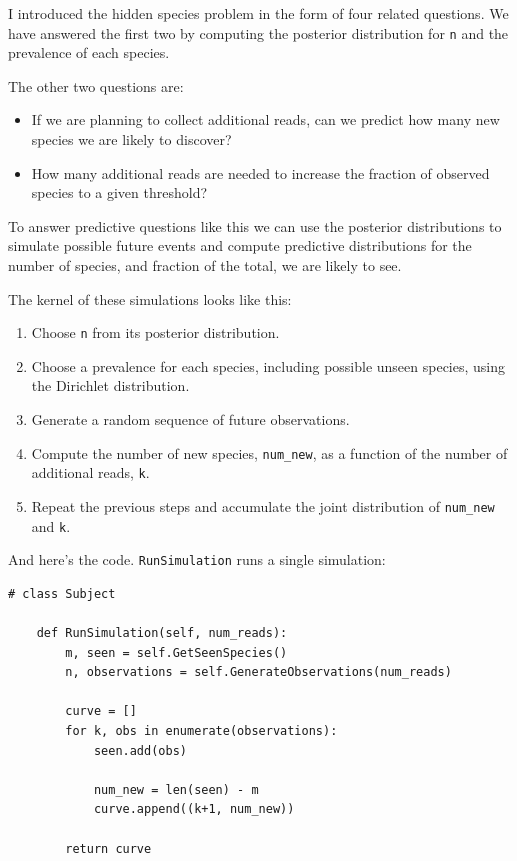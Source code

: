 \documentclass[12pt]{book}
\begin{document}
I introduced the hidden species problem in the form of four related
questions.  We have answered the first two by computing the posterior
distribution for {\tt n} and the prevalence of each species.

The other two questions are:

\begin{itemize}

\item If we are planning to collect additional reads, can we predict
  how many new species we are likely to discover?

\item How many additional reads are needed to increase the
  fraction of observed species to a given threshold?

\end{itemize}

To answer predictive questions like this we can use the posterior
distributions to simulate possible future events and compute
predictive distributions for the number of species, and fraction of
the total, we are likely to see.

The kernel of these simulations looks like this:

\begin{enumerate}

\item Choose {\tt n} from its posterior distribution.

\item Choose a prevalence for each species, including possible unseen
  species, using the Dirichlet distribution.

\item Generate a random sequence of future observations.

\item Compute the number of new species, \verb"num_new", as a function
  of the number of additional reads, {\tt k}.

\item Repeat the previous steps and accumulate the joint distribution
  of \verb"num_new" and {\tt k}.

\end{enumerate}

And here's the code.  {\tt RunSimulation} runs a single simulation:

\begin{verbatim}
# class Subject

    def RunSimulation(self, num_reads):
        m, seen = self.GetSeenSpecies()
        n, observations = self.GenerateObservations(num_reads)

        curve = []
        for k, obs in enumerate(observations):
            seen.add(obs)

            num_new = len(seen) - m
            curve.append((k+1, num_new))

        return curve
\end{verbatim}
\end{document}
